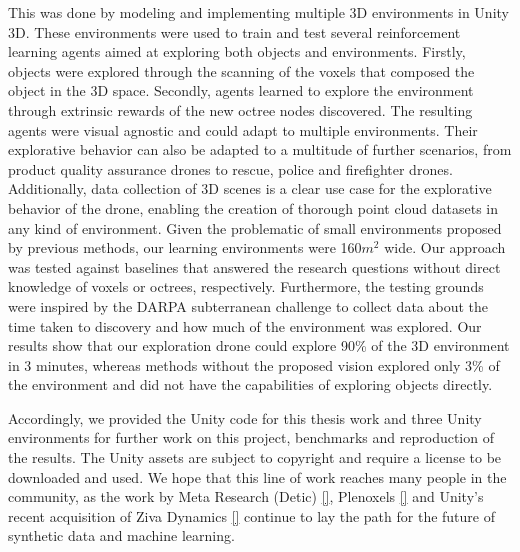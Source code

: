 This was done by modeling and implementing multiple 3D environments in Unity 3D.
These environments were used to train and test several reinforcement learning agents aimed at exploring both objects and environments.
Firstly, objects were explored through the scanning of the voxels that composed the object in the 3D space. 
Secondly, agents learned to explore the environment through extrinsic rewards of the new octree nodes discovered. The resulting agents were visual agnostic and could adapt to multiple environments. Their explorative behavior can also be adapted to a multitude of further scenarios, from product quality assurance drones to rescue, police and firefighter drones. 
Additionally, data collection of 3D scenes is a clear use case for the explorative behavior of the drone, enabling the creation of thorough point cloud datasets in any kind of environment. Given the problematic of small environments proposed by previous methods, our learning environments were 160$m^2$ wide. Our approach was tested against baselines that answered the research questions without direct knowledge of voxels or octrees, respectively. Furthermore, the testing grounds were inspired by the DARPA subterranean challenge to collect data about the time taken to discovery and how much of the environment was explored. Our results show that our exploration drone could explore 90\% of the 3D environment in 3 minutes, whereas methods without the proposed vision explored only 3\% of the environment and did not have the capabilities of exploring objects directly. 

Accordingly, we provided the Unity code for this thesis work and three Unity environments for further work on this project, benchmarks and reproduction of the results. The Unity assets are subject to copyright and require a license to be downloaded and used. We hope that this line of work reaches many people in the community, as the work by Meta Research (Detic) \ref{}, Plenoxels \ref{} and Unity's recent acquisition of Ziva Dynamics \ref{} continue to lay the path for the future of synthetic data and machine learning.


